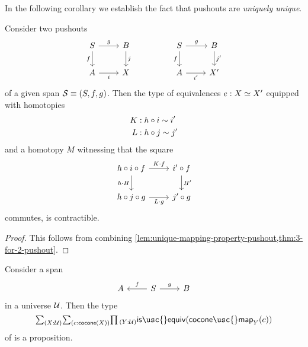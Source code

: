 In the following corollary we establish the fact that pushouts are \emph{uniquely unique}.

\begin{cor}
  Consider two pushouts
  \begin{equation*}
    \begin{tikzcd}
      S \arrow[r,"g"] \arrow[d,swap,"f"] & B \arrow[d,"j"]
      & & S \arrow[r,"g"] \arrow[d,swap,"f"] & B \arrow[d,"{j'}"] \\
      A \arrow[r,swap,"i"] & X
      & & A \arrow[r,swap,"{i'}"] & X'
    \end{tikzcd}
  \end{equation*}
  of a given span $\mathcal{S}\equiv (S,f,g)$. Then the type of equivalences $e:\eqv{X}{X'}$ equipped with homotopies
  \begin{align*}
    K & : h\circ i \sim i' \\
    L & : h\circ j \sim j'
  \end{align*}
  and a homotopy $M$ witnessing that the square
  \begin{equation*}
    \begin{tikzcd}
      h\circ i\circ f \arrow[r,"K\cdot f"] \arrow[d,swap,"h\cdot H"] & i' \circ f \arrow[d,"{H'}"] \\
      h\circ j\circ g \arrow[r,swap,"L\cdot g"] & j'\circ g
    \end{tikzcd}
  \end{equation*}
  commutes, is contractible.
\end{cor}

\begin{proof}
  This follows from combining \cref{lem:unique-mapping-property-pushout,thm:3-for-2-pushout}.
\end{proof}

\begin{cor}\label{cor:uniquely-unique-pushout}
  Consider a span
  \begin{equation*}
    \begin{tikzcd}
      A & S \arrow[l,swap,"f"] \arrow[r,"g"] & B
    \end{tikzcd}
  \end{equation*}
  in a universe $\mathcal{U}$. Then the type
  \begin{equation*}
    \sm{X:\UU}{c:\mathsf{cocone}(X)}\prd{Y:\UU}\mathsf{is\usc{}equiv}(\mathsf{cocone\usc{}map}_Y(c))
  \end{equation*}
  of is a proposition.
\end{cor}

